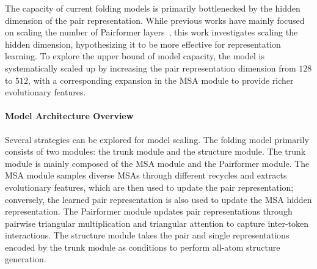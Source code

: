 \documentclass[]{bytedance_seed}
\begin{document}
The capacity of current folding models is primarily bottlenecked by the hidden dimension of the pair representation. While previous works have mainly focused on scaling the number of Pairformer layers~\cite{passaro2025boltz,bytedance2025protenix}, this work investigates scaling the hidden dimension, hypothesizing it to be more effective for representation learning. To explore the upper bound of model capacity, the model is systematically scaled up by increasing the pair representation dimension from $128$ to $512$, with a corresponding expansion in the MSA module to provide richer evolutionary features.

\paragraph{Model Architecture Overview}
Several strategies can be explored for model scaling. The folding model primarily consists of two modules: the trunk module and the structure module. The trunk module is mainly composed of the MSA module and the Pairformer module. The MSA module samples diverse MSAs through different recycles and extracts evolutionary features, which are then used to update the pair representation; conversely, the learned pair representation is also used to update the MSA hidden representation. The Pairformer module updates pair representations through pairwise triangular multiplication and triangular attention to capture inter-token interactions. The structure module takes the pair and single representations encoded by the trunk module as conditions to perform all-atom structure generation.
\end{document}
